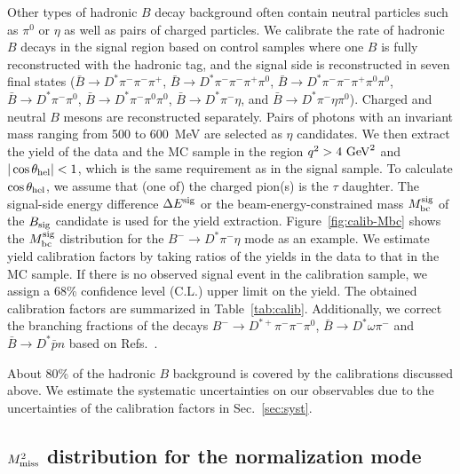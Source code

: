 \documentclass[aps,prd,twocolumn,superscriptaddress,showpacs,preprintnumbers,amsmath,amssymb]{revtex4-1}
\begin{document}
Other types of hadronic $B$ decay background often contain neutral particles such as $\pi^0$ or $\eta$ as well as pairs of charged particles. We calibrate the rate of hadronic $B$ decays in the signal region based on control samples where one $B$ is fully reconstructed with the hadronic tag, and the signal side is reconstructed in seven final states (${\bar B} \rightarrow D^* \pi^- \pi^- \pi^+$, ${\bar B} \rightarrow D^* \pi^- \pi^- \pi^+ \pi^0$, ${\bar B} \rightarrow D^* \pi^- \pi^- \pi^+ \pi^0 \pi^0$, ${\bar B} \rightarrow D^* \pi^- \pi^0$, ${\bar B} \rightarrow D^* \pi^- \pi^0 \pi^0$, ${\bar B} \rightarrow D^* \pi^- \eta$, and ${\bar B} \rightarrow D^* \pi^- \eta \pi^0$). Charged and neutral $B$ mesons are reconstructed separately. Pairs of photons with an invariant mass ranging from 500 to 600~MeV are selected as $\eta$ candidates. We then extract the yield of the data and the MC sample in the region $q^2 > 4~{\rm GeV}^2$ and $|\cos\theta_{\rm hel}| < 1$, which is the same requirement as in the signal sample. To calculate $\cos\theta_{\rm hel}$, we assume that (one of) the charged pion(s) is the $\tau$ daughter. The signal-side energy difference $\Delta E^{\rm sig}$ or the beam-energy-constrained mass $M_{\rm bc}^{\rm sig}$ of the $B_{\rm sig}$ candidate is used for the yield extraction. Figure~\ref{fig:calib-Mbc} shows the $M_{\rm bc}^{\rm sig}$ distribution for the $B^- \rightarrow D^* \pi^- \eta$ mode as an example. We estimate yield calibration factors by taking ratios of the yields in the data to that in the MC sample. If there is no observed signal event in the calibration sample, we assign a 68\% confidence level (C.L.) upper limit on the yield. The obtained calibration factors are summarized in Table~\ref{tab:calib}. Additionally, we correct the branching fractions of the decays $B^- \rightarrow D^{*+} \pi^- \pi^- \pi^0$, ${\bar B} \rightarrow D^* \omega \pi^-$ and ${\bar B} \rightarrow D^* {\bar p} n$ based on Refs.~\cite{cite:PDG:2016,cite:Belle_Dstomegapi:2015}.

About 80\% of the hadronic $B$ background is covered by the calibrations discussed above. We estimate the systematic uncertainties on our observables due to the uncertainties of the calibration factors in Sec.~\ref{sec:syst}.

\subsection{\textbf{\boldmath$M_{\rm miss}^2$} distribution for the normalization mode}\label{sec:Mmiss2}
\end{document}
